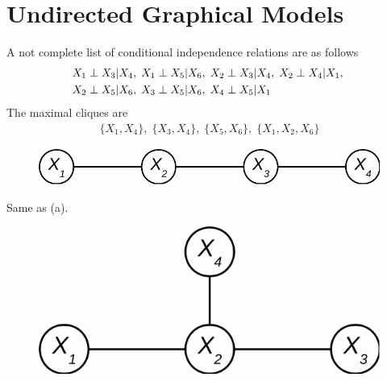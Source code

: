 \chapter{Undirected Graphical Models}
\label{ch:17}

\begin{exercise}
  A not complete list of conditional independence relations are as follows
  \begin{align}
    & X_1\perp X_3|X_4,\; X_1\perp X_5|X_6,\; X_2\perp X_3|X_4,\; X_2\perp
    X_4|X_1,\; \notag \\
    & X_2\perp X_5|X_6,\;X_3\perp X_5|X_6,\;X_4\perp X_5|X_1
  \end{align}
  The maximal cliques are
  \begin{align}
    \{X_1, X_4\},\;\{X_3, X_4\},\;\{X_5, X_6\},\;\{X_1, X_2, X_6\}
  \end{align}
\end{exercise}

\begin{exercise}
  \begin{exerciseSection}
    \begin{figure}[htb]
      \centering
      \includegraphics[width=0.4\columnwidth]{./figs/17_2_a.pdf}
      \label{fig:chap_17_2_a}
    \end{figure}
  \end{exerciseSection}
  
  \begin{exerciseSection}
    Same as (a).
  \end{exerciseSection}
  
  \begin{exerciseSection}
    \begin{figure}[htb]
      \centering
      \includegraphics[width=0.3\columnwidth]{./figs/17_2_c.pdf}
      \label{fig:chap_17_2_c}
    \end{figure}
  \end{exerciseSection}
\end{exercise}

